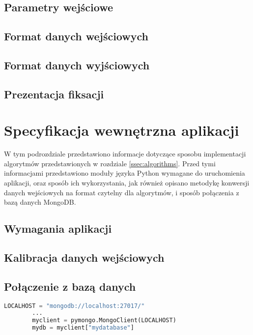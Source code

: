 \subsection{Parametry wejściowe}
\subsection{Format danych wejściowych}
\subsection{Format danych wyjściowych}
\subsection{Prezentacja fiksacji}
\section{Specyfikacja wewnętrzna aplikacji}
W tym podrozdziale przedstawiono informacje dotyczące sposobu implementacji algorytmów przedstawionych w rozdziale \ref{ssec:algorithms}. Przed tymi informacjami przedstawiono moduły języka Python wymagane do uruchomienia aplikacji, oraz sposób ich wykorzystania, jak również opisano metodykę konwersji danych wejściowych na format czytelny dla algorytmów, i sposób połączenia z bazą danych MongoDB.
\subsection{Wymagania aplikacji}
\subsection{Kalibracja danych wejściowych}
\subsection{Połączenie z bazą danych}
\begin{lstlisting}[language=Python, caption=Połączenie z bazą danych, label={lst:connectDB}]
        LOCALHOST = "mongodb://localhost:27017/"
        ...
        myclient = pymongo.MongoClient(LOCALHOST)
        mydb = myclient["mydatabase"]
\end{lstlisting}

